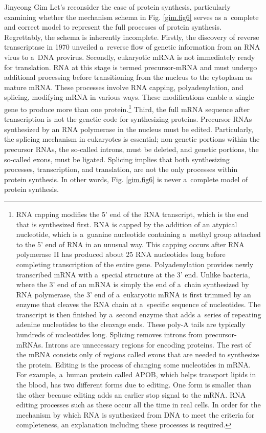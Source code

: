 \begin{artengenv}{Jinyeong Gim}
\enlargethispage{1.5\baselineskip}
Let's reconsider the case of protein synthesis, particularly examining whether the mechanism schema in Fig. \ref{gim.fig6} serves as a~complete and correct model to represent the full processes of protein synthesis. Regrettably, the schema is inherently incomplete. Firstly, the discovery of reverse transcriptase in 1970 unveiled a~reverse flow of genetic information from an RNA virus to a~DNA provirus. Secondly, eukaryotic mRNA is not immediately ready for translation. RNA at this stage is termed precursor-mRNA and must undergo additional processing before transitioning from the nucleus to the cytoplasm as mature mRNA. These processes involve RNA capping, polyadenylation, and splicing, modifying mRNA in various ways. These modifications enable a~single gene to produce more than one protein.\footnote{RNA capping modifies the 5' end of the RNA transcript, which is the end that is synthesized first. RNA is capped by the addition of an atypical nucleotide, which is a~guanine nucleotide containing a~methyl group attached to the 5' end of RNA in an unusual way. This capping occurs after RNA polymerase II has produced about 25 RNA nucleotides long before completing transcription of the entire gene. Polyadenylation provides newly transcribed mRNA with a~special structure at the 3' end. Unlike bacteria, where the 3' end of an mRNA is simply the end of a~chain synthesized by RNA polymerase, the 3' end of a~eukaryotic mRNA is first trimmed by an enzyme that cleaves the RNA chain at a~specific sequence of nucleotides. The transcript is then finished by a~second enzyme that adds a~series of repeating adenine nucleotides to the cleavage ends. These poly-A tails are typically hundreds of nucleotides long. Splicing removes introns from precursor-mRNAs. Introns are unnecessary regions for encoding proteins. The rest of the mRNA consists only of regions called exons that are needed to synthesize the protein. Editing is the process of changing some nucleotides in mRNA. For example, a~human protein called APOB, which helps transport lipids in the blood, has two different forms due to editing. One form is smaller than the other because editing adds an earlier stop signal to the mRNA. RNA editing processes such as these occur all the time in real cells. In order for the mechanism by which RNA is synthesized from DNA to meet the criteria for completeness, an explanation including these processes is required.} Third, the full mRNA sequence after transcription is not the genetic code for synthesizing proteins. Precursor RNAs synthesized by an RNA polymerase in the nucleus must be edited. Particularly, the splicing mechanism in eukaryotes is essential; non-genetic portions within the precursor RNAs, the so-called introns, must be deleted, and genetic portions, the so-called exons, must be ligated. Splicing implies that both synthesizing processes, transcription, and translation, are not the only processes within protein synthesis. In other words, Fig. \ref{gim.fig6} is never a~complete model of protein synthesis.
\enlargethispage{1.5\baselineskip}


\end{artengenv}
